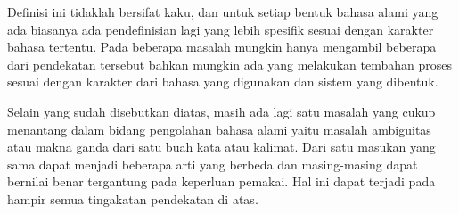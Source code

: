 Definisi ini tidaklah bersifat kaku, dan untuk setiap bentuk bahasa alami yang ada biasanya ada pendefinisian lagi yang lebih spesifik sesuai dengan karakter bahasa tertentu. Pada beberapa masalah mungkin hanya mengambil beberapa dari pendekatan tersebut bahkan mungkin ada yang melakukan tembahan proses sesuai dengan karakter dari bahasa yang digunakan dan sistem yang dibentuk.

Selain yang sudah disebutkan diatas, masih ada lagi satu masalah yang cukup menantang dalam bidang pengolahan bahasa alami yaitu masalah ambiguitas atau makna ganda dari satu buah kata atau kalimat. Dari satu masukan yang sama dapat menjadi beberapa arti yang berbeda dan masing-masing dapat bernilai benar tergantung pada keperluan pemakai. Hal ini dapat terjadi pada hampir semua tingakatan pendekatan di atas.